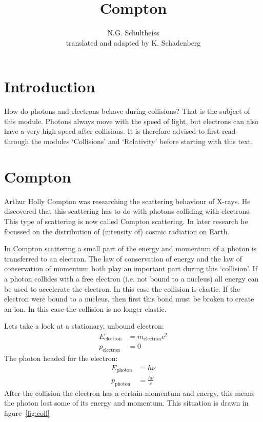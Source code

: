 


\author{N.G. Schultheiss \\ translated and adapted by K. Schadenberg}
\date{}
\title{Compton}



\maketitle

\section{Introduction}
How do photons and electrons behave during collisions? That is the subject of this module. Photons always move with the speed of light, but electrons can also have a very high speed after collisions. It is therefore advised to first read through the modules `Collisions' and `Relativity' before starting with this text.

\section{Compton}
Arthur Holly Compton was researching the scattering behaviour of X-rays. He discovered that this scattering has to do with photons colliding with electrons. This type of scattering is now called Compton scattering. In later research he focussed on the distribution of (intensity of) cosmic radiation on Earth.

In Compton scattering a small part of the energy and momentum of a photon is transferred to an electron. The law of conservation of energy and the law of conservation of momentum both play an important part during this `collision'. If a photon collides with a free electron (i.e. not bound to a nucleus) all energy can be used to accelerate the electron. In this case the collision is elastic. If the electron were bound to a nucleus, then first this bond must be broken to create an ion. In this case the collision is no longer elastic.

Lets take a look at a stationary, unbound electron:
\begin{align}
E_{\mbox{electron}} &= m_{\mbox{electron}}c^2 \\
p_{\mbox{electron}} &= 0 \label{eq:E_e}
\end{align}
The photon headed for the electron:
\begin{align}
E_{\mbox{photon}} &= h \nu\\
p_{\mbox{photon}} &= \frac{h \nu}{c} \label{eq:E_ph}
\end{align}
After the collision the electron has a certain momentum and energy, this means the photon lost some of its energy and momentum. This situation is drawn in figure~\ref{fig:coll}

